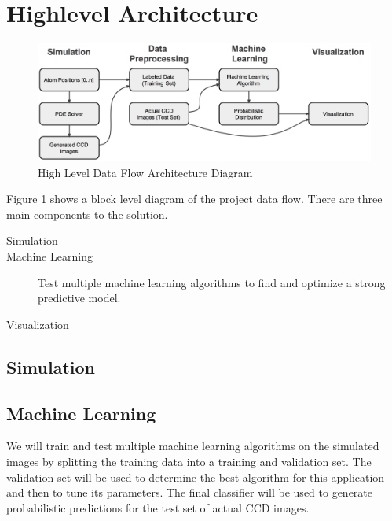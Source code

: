 \section{Highlevel Architecture}
\label{architecture}

\begin{figure}[h]
\begin{center}
\includegraphics[scale=0.4]{arch.png}
\caption{High Level Data Flow Architecture Diagram}
\label{fig:arch}
\end{center}
\end{figure}

\noindent Figure 1 shows a block level diagram of the project data flow. There are three main components to the solution.
\begin{description}
\item[Simulation] 
\item[Machine Learning] Test multiple machine learning algorithms to find and optimize a strong predictive model.
\item[Visualization]
\end{description}

\subsection{Simulation}

\subsection{Machine Learning}
We will train and test multiple machine learning algorithms on the simulated images by splitting the training data into a training and validation set.  The validation set will be used to determine the best algorithm for this application and then to tune its parameters.  The final classifier will be used to generate probabilistic predictions for the test set of actual CCD images.
 
